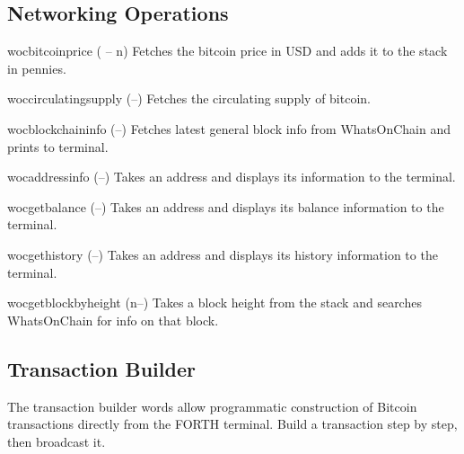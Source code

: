 \documentclass[a4paper, 11pt, openany]{book}
\begin{document}
\subsection{Networking Operations}

\begin{forthbox}
  wocbitcoinprice         ( -- n)
                          Fetches the bitcoin price in USD and
                          adds it to the stack in pennies.

  woccirculatingsupply    (--)
                          Fetches the circulating supply of
                          bitcoin.

  wocblockchaininfo       (--)
                          Fetches latest general block info from
                          WhatsOnChain and prints to terminal.

  wocaddressinfo          (--)
                          Takes an address and displays its
                          information to the terminal.

  wocgetbalance           (--)
                          Takes an address and displays its
                          balance information to the terminal.

  wocgethistory           (--)
                          Takes an address and displays its
                          history information to the terminal.

  wocgetblockbyheight     (n--)
                          Takes a block height from the stack and
                          searches WhatsOnChain for info on that
                          block.
\end{forthbox}

\subsection{Transaction Builder}

The transaction builder words allow programmatic construction of Bitcoin transactions directly from the FORTH terminal. Build a transaction step by step, then broadcast it.
\end{document}

